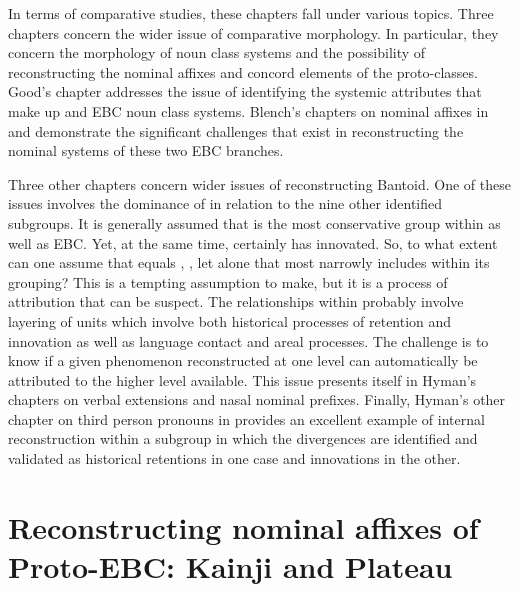 \documentclass[output=paper]{langsci/langscibook}
\begin{document}
In terms of comparative studies, these chapters fall under various topics. Three chapters concern the wider issue of comparative morphology. In particular, they concern the morphology of noun class systems and the possibility of reconstructing the nominal affixes and concord elements of the proto-classes. Good’s chapter addresses the issue of identifying the systemic attributes that make up  and EBC noun class systems. Blench’s chapters on nominal affixes in  and  demonstrate the significant challenges that exist in reconstructing the nominal systems of these two EBC branches.

Three other chapters concern wider issues of reconstructing Bantoid. One of these issues involves the dominance of  in relation to the nine other identified  subgroups. It is generally assumed that  is the most conservative group within  as well as EBC. Yet, at the same time,  certainly has innovated. So, to what extent can one assume that  equals , , let alone  that most narrowly includes  within its grouping? This is a tempting assumption to make, but it is a process of attribution that can be suspect. The relationships within  probably involve layering of units which involve both historical processes of retention and innovation as well as language contact and areal processes. The challenge is to know if a given phenomenon reconstructed at one level can automatically be attributed to the higher level available. This issue presents itself in Hyman's chapters on verbal extensions and nasal nominal prefixes. Finally, Hyman’s  other chapter on third person pronouns in  provides an excellent example of internal reconstruction within a subgroup in which the divergences are identified and validated as historical retentions in one case and innovations in the other. 


\section{Reconstructing nominal affixes of Proto-EBC: Kainji and Plateau}\label{sec:watters:5}
\end{document}
